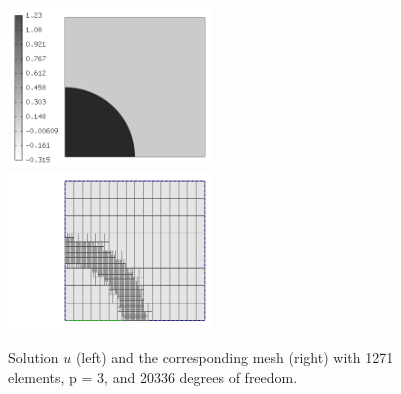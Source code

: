 \begin{figure}[H]
\begin{center}
\includegraphics[width=0.48\textwidth]{minor_examples/DG02.png}\ \ \ 
\includegraphics[width=0.48\textwidth]{minor_examples/DG02Mesh.png}
\end{center}
\vspace{-4mm}
\caption{Solution $u$ (left) and the corresponding mesh (right) with 1271 elements, p = 3, and 20336 degrees of freedom.}
\end{figure}
